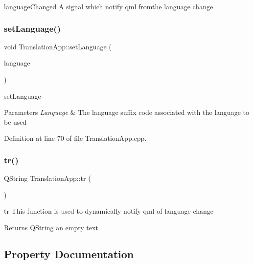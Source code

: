 language\+Changed A signal which notify qml fromthe language change 

\mbox{\label{class_translation_app_a7d19253f523f92c290b31bf8ba363cad}} 
\subsubsection{\texorpdfstring{set\+Language()}{setLanguage()}}
{\footnotesize\ttfamily void Translation\+App\+::set\+Language (\begin{DoxyParamCaption}\item[{const Q\+String \&}]{language }\end{DoxyParamCaption})}



set\+Language 


\begin{DoxyParams}{Parameters}
{\em Language} & The language suffix code associated with the language to be used \\
\hline
\end{DoxyParams}


Definition at line 70 of file Translation\+App.\+cpp.

\mbox{\label{class_translation_app_a71ce718c29f15b4819f0954ae491efb7}} 
\subsubsection{\texorpdfstring{tr()}{tr()}}
{\footnotesize\ttfamily Q\+String Translation\+App\+::tr (\begin{DoxyParamCaption}{ }\end{DoxyParamCaption})}



tr This function is used to dynamically notify qml of language change 

\begin{DoxyReturn}{Returns}
Q\+String an empty text 
\end{DoxyReturn}


\subsection{Property Documentation}
\mbox{\label{class_translation_app_a3f99c10dae6f19934211e608bb44ab8b}} 

